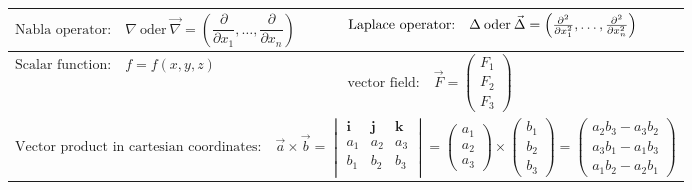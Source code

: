		\begin{tabularx}{\linewidth}{l|X}
		$\text{Nabla operator:}\quad \nabla \: \mathrm{oder} \: \vec \nabla = \left (\dfrac\partial{\partial
			x_1},\ldots, \dfrac\partial{\partial x_n}\right) $ 
		&
		$\text{Laplace operator:}\quad \Delta \: \mathrm{oder} \: \vec {\Delta} = \left (\frac{\partial^2}{\partial
			x_1^2},\ldots, \frac{\partial^2}{\partial x_n^2}\right)$
		\\
		\hline
		$\text{Scalar function:}\quad f = f(x,y,z)$
		&
		$\text{vector field:}	\quad \vec F = \begin{pmatrix} F_1 \\ F_2 \\ F_3 \end{pmatrix}$
		\\
		\hline
		\multicolumn{2}{l}{
		$
		\text{Vector product in cartesian coordinates:}\quad\vec{a}\times\vec{b} = \begin{vmatrix}
		\textbf{i} & \textbf{j} & \textbf{k} \\ a_1 & a_2 & a_3 \\ b_1 & b_2 & b_3\\ \end{vmatrix} =
		\begin{pmatrix}a_1 \\ a_2 \\ a_3\end{pmatrix} \times
		\begin{pmatrix}b_1 \\ b_2 \\ b_3 \end{pmatrix} = \begin{pmatrix} a_2b_3 - a_3b_2
		\\ a_3b_1 - a_1b_3 \\ a_1b_2 - a_2b_1 \end{pmatrix}$}\\
	\hline 
	\end{tabularx}
			

